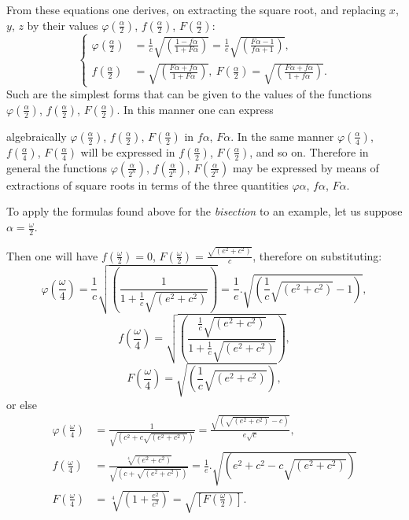 \documentclass{article}
\begin{document}
From these equations one derives, on extracting the square root, and replacing $x$, $y$, $z$ by their values $\varphi\left(\frac{\alpha}{2}\right)$, $f\left(\frac{\alpha}{2}\right)$, $F\left(\frac{\alpha}{2}\right)$:
\[ \left\{\begin{aligned}
\varphi\left(\frac{\alpha}{2}\right)&=\frac{1}{c}\sqrt{\left(\frac{1-f\alpha}{1+F\alpha}\right)}=\frac{1}{e}\sqrt{\left(\frac{F\alpha-1}{f\alpha+1}\right)},\\
f\left(\frac{\alpha}{2}\right)&=\sqrt{\left(\frac{F\alpha+f\alpha}{1+F\alpha}\right)},\ F\left(\frac{\alpha}{2}\right)=\sqrt{\left(\frac{F\alpha+f\alpha}{1+f\alpha}\right)}.
\end{aligned}\right. \tag{67.} \]
Such are the simplest forms that can be given to the values of the functions $\varphi\left(\frac{\alpha}{2}\right)$, $f\left(\frac{\alpha}{2}\right)$, $F\left(\frac{\alpha}{2}\right)$. In this manner one can express

algebraically $\varphi\left(\frac{\alpha}{2}\right)$, $f\left(\frac{\alpha}{2}\right)$, $F\left(\frac{\alpha}{2}\right)$ in $f\alpha$, $F\alpha$. In the same manner $\varphi\left(\frac{\alpha}{4}\right)$, $f\left(\frac{\alpha}{4}\right)$, $F\left(\frac{\alpha}{4}\right)$ will be expressed in $f\left(\frac{\alpha}{2}\right)$, $F\left(\frac{\alpha}{2}\right)$, and so on. Therefore in general the functions $\varphi\left(\frac{\alpha}{2^{n}}\right)$, $f\left(\frac{\alpha}{2^{n}}\right)$, $F\left(\frac{\alpha}{2^{n}}\right)$ may be expressed by means of extractions of square roots in terms of the three quantities $\varphi\alpha$, $f\alpha$, $F\alpha$.

To apply the formulas found above for the \emph{bisection} to an example, let us suppose $\alpha=\frac{\omega}{2}$.

Then one will have $f\left(\frac{\omega}{2}\right)=0$, $F\left(\frac{\omega}{2}\right)=\frac{\sqrt{(e^{2}+c^{2})}}{c}$, therefore on substituting:
\[ \varphi\left(\frac{\omega}{4}\right)=\frac{1}{c}\sqrt{\left(\frac{1}{1+\frac{1}{c}\sqrt{(e^{2}+c^{2})}}\right)}=\frac{1}{e}.\sqrt{\left(\frac{1}{c}\sqrt{(e^{2}+c^{2})}-1\right)}, \]
\[ f\left(\frac{\omega}{4}\right)=\sqrt{\left(\frac{\frac{1}{c}\sqrt{(e^{2}+c^{2})}}{1+\frac{1}{c}\sqrt{(e^{2}+c^{2})}}\right)}, \]
\[ F\left(\frac{\omega}{4}\right)=\sqrt{\left(\frac{1}{c}\sqrt{(e^{2}+c^{2})}\right)}, \]
or else
\[ \begin{aligned}
\varphi\left(\frac{\omega}{4}\right)&=\frac{1}{\sqrt{(c^{2}+c\sqrt{(e^{2}+c^{2})})}}=\frac{\sqrt{(\sqrt{(e^{2}+c^{2})}-c)}}{e\sqrt{c}},\\
f\left(\frac{\omega}{4}\right)&=\frac{\sqrt[4]{(e^{2}+c^{2})}}{\sqrt{(c+\sqrt{(e^{2}+c^{2})})}}=\frac{1}{e}.\sqrt{(e^{2}+c^{2}-c\sqrt{(e^{2}+c^{2})})}\\
F\left(\frac{\omega}{4}\right)&=\sqrt[4]{\left(1+\frac{e^{2}}{c^{2}}\right)}=\sqrt{\left[F\left(\frac{\omega}{2}\right)\right]}.
\end{aligned} \]
\end{document}
